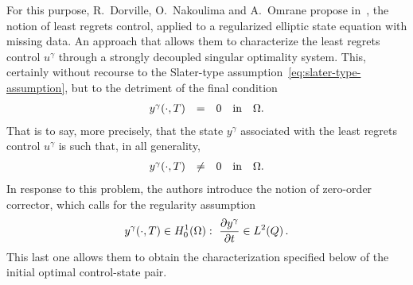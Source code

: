 For this purpose,  R.~Dorville, O.~Nakoulima and A.~Omrane propose
in~\cite{dorville}, the notion of least regrets control, applied to a
regularized elliptic state equation with missing data. An approach that
allows them to characterize the least regrets control $u^{\gamma}$ through
a strongly decoupled singular optimality system. This, certainly without
recourse to the Slater-type assumption~\eqref{eq:slater-type-assumption},
but to the detriment of the final condition
\begin{equation*}
    \begin{array}{rclll}
        {y^{\gamma}}\!\left({\cdot,T}\right) & = & 0 & \text{in} & \Omega.
    \end{array}
\end{equation*}
That is to say, more precisely, that the state $y^{\gamma}$ associated with
the least regrets control $u^{\gamma}$ is such that, in all generality,
\begin{equation*}
    \begin{array}{rclll}
        {y^{\gamma}}\!\left({\cdot,T}\right) & \neq & 0 & \text{in} & \Omega.
    \end{array}
\end{equation*}
In response to this problem, the authors introduce the notion of zero-order
corrector, which calls for the regularity assumption
\begin{equation}\label{eq:dorvilleassumption}
    {y^{\gamma}}\!\left({\cdot,T}\right)\in H_{0}^{1}(\Omega):\
    \dfrac{\partial{}y^{\gamma}}{\partial{}t}\in L^{2}\!\left({Q}\right).
\end{equation}
This last one allows them to obtain the characterization specified below of
the initial optimal control-state pair.

